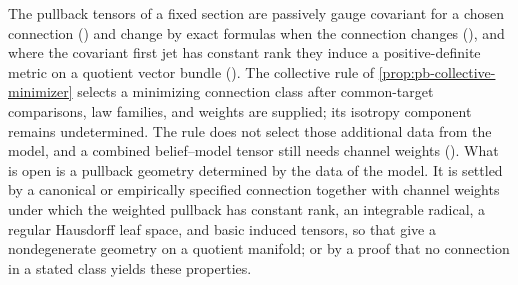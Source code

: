 The pullback tensors of a fixed section are passively gauge covariant for a chosen connection
() and change by exact formulas when the connection changes
(), and where the covariant first jet has constant rank they
induce a positive-definite metric on a quotient vector bundle ().
The collective rule of \cref{prop:pb-collective-minimizer} selects a minimizing connection class
after common-target comparisons, law families, and weights are supplied; its isotropy component
remains undetermined. The rule does not select those additional data from the model, and a combined
belief--model tensor still needs channel weights ().
What is open is a pullback geometry determined by the data
of the model. It is settled by a canonical or empirically specified connection together with channel
weights under which the weighted pullback has constant rank, an integrable radical, a regular Hausdorff
leaf space, and basic induced tensors, so that
 give a nondegenerate
geometry on a quotient manifold; or by a proof that no connection in a stated class yields these
properties.

